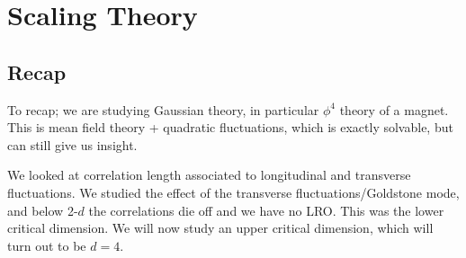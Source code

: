 \section{Scaling Theory}
\subsection{Recap}
To recap; we are studying Gaussian theory, in particular $\phi^4$ theory of a magnet. This is mean field theory + quadratic fluctuations, which is exactly solvable, but can still give us insight.

We looked at correlation length associated to longitudinal and transverse fluctuations. We studied the effect of the transverse fluctuations/Goldstone mode, and below 2-$d$ the correlations die off and we have no LRO. This was the lower critical dimension. We will now study an upper critical dimension, which will turn out to be $d = 4$.

